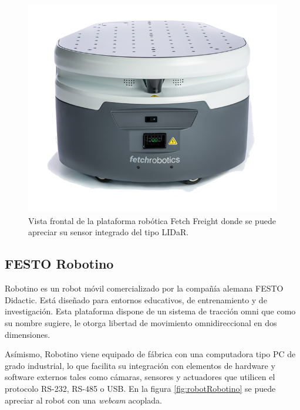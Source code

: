 \newpage

\begin{figure}[ht]
	\centering
	\includegraphics[scale=1.1]{./Figures/freight.png}
	\caption{Vista frontal de la plataforma robótica Fetch Freight donde se puede apreciar su sensor integrado del tipo LIDaR\protect\footnotemark.}
	\label{fig:robotFreight}
\end{figure}


\subsection{FESTO Robotino}

Robotino es un robot móvil comercializado por la compañía alemana FESTO Didactic. Está diseñado para entornos educativos, de entrenamiento y de investigación.
Esta plataforma dispone de un sistema de tracción omni que como su nombre sugiere, le otorga libertad de movimiento omnidireccional en dos dimensiones.

Asímismo, Robotino viene equipado de fábrica con una computadora tipo PC de grado industrial, lo que facilita su integración con elementos de hardware y software externos tales como cámaras, sensores y actuadores que utilicen el protocolo RS-232, RS-485 o USB. En la figura \ref{fig:robotRobotino} se puede apreciar al robot con una \textit{webcam} acoplada.

